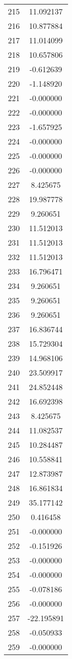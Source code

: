 \documentclass[12pt]{article}
\begin{document}
\begin{longtable}{@{}cc@{}}
215 & 11.092137 \\
216 & 10.877884 \\
217 & 11.014099 \\
218 & 10.657806 \\
219 & -0.612639 \\
220 & -1.148920 \\
221 & -0.000000 \\
222 & -0.000000 \\
223 & -1.657925 \\
224 & -0.000000 \\
225 & -0.000000 \\
226 & -0.000000 \\
227 & 8.425675 \\
228 & 19.987778 \\
229 & 9.260651 \\
230 & 11.512013 \\
231 & 11.512013 \\
232 & 11.512013 \\
233 & 16.796471 \\
234 & 9.260651 \\
235 & 9.260651 \\
236 & 9.260651 \\
237 & 16.836744 \\
238 & 15.729304 \\
239 & 14.968106 \\
240 & 23.509917 \\
241 & 24.852448 \\
242 & 16.692398 \\
243 & 8.425675 \\
244 & 11.082537 \\
245 & 10.284487 \\
246 & 10.558841 \\
247 & 12.873987 \\
248 & 16.861834 \\
249 & 35.177142 \\
250 & 0.416458 \\
251 & -0.000000 \\
252 & -0.151926 \\
253 & -0.000000 \\
254 & -0.000000 \\
255 & -0.078186 \\
256 & -0.000000 \\
257 & -22.195891 \\
258 & -0.050933 \\
259 & -0.000000 \\

\end{longtable}
\end{document}
